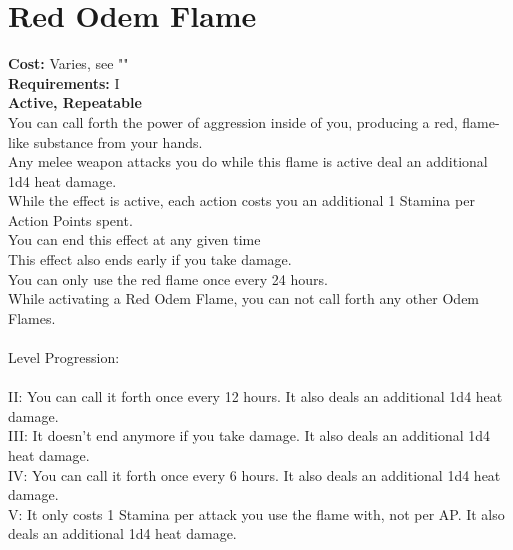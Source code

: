 \section{Red Odem Flame}\label{perk:redOdemFlame}
\textbf{Cost:} Varies, see ""\\
\textbf{Requirements:} I\\
\textbf{Active, Repeatable}\\
You can call forth the power of aggression inside of you, producing a red, flame-like substance from your hands.\\
Any melee weapon attacks you do while this flame is active deal an additional 1d4 heat damage.\\
While the effect is active, each action costs you an additional 1 Stamina per Action Points spent.\\
You can end this effect at any given time\\
This effect also ends early if you take damage.\\
You can only use the red flame once every 24 hours.\\
While activating a Red Odem Flame, you can not call forth any other Odem Flames.\\
\\
Level Progression:\\
\\
II: You can call it forth once every 12 hours.
It also deals an additional 1d4 heat damage.\\
III: It doesn't end anymore if you take damage.
It also deals an additional 1d4 heat damage.\\
IV: You can call it forth once every 6 hours.
It also deals an additional 1d4 heat damage.\\
V: It only costs 1 Stamina per attack you use the flame with, not per AP.
It also deals an additional 1d4 heat damage.\\